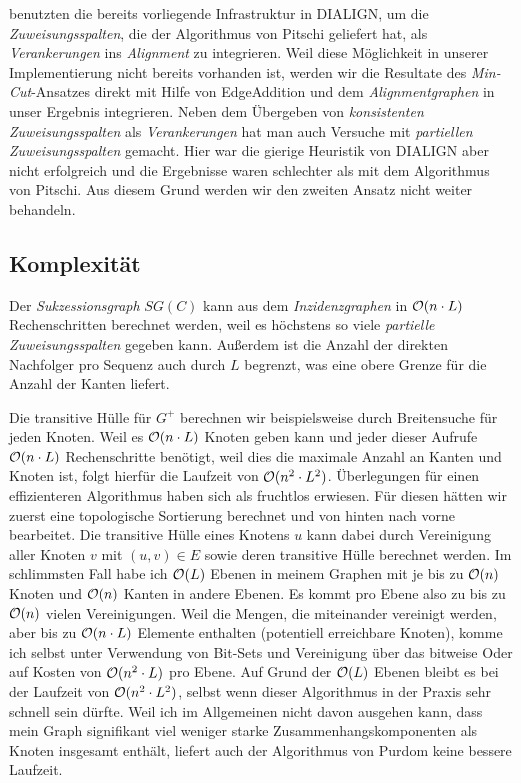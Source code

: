\cite{cpm10} benutzten die bereits vorliegende Infrastruktur in DIALIGN, um die \emph{Zuweisungsspalten}, die der Algorithmus von Pitschi geliefert hat, als \emph{Verankerungen} ins \emph{Alignment} zu integrieren. Weil diese Möglichkeit in unserer Implementierung nicht bereits vorhanden ist, werden wir die Resultate des \emph{Min-Cut}-Ansatzes direkt mit Hilfe von \textrm{EdgeAddition} und dem \emph{Alignmentgraphen} in unser Ergebnis integrieren. Neben dem Übergeben von \emph{konsistenten Zuweisungsspalten} als \emph{Verankerungen} hat man auch Versuche mit \emph{partiellen Zuweisungsspalten} gemacht. Hier war die gierige Heuristik von DIALIGN aber nicht erfolgreich und die Ergebnisse waren schlechter als mit dem Algorithmus von Pitschi. Aus diesem Grund werden wir den zweiten Ansatz nicht weiter behandeln.

\subsection{Komplexität}

Der \emph{Sukzessionsgraph} $SG(C)$ kann aus dem \emph{Inzidenzgraphen} in $\mathcal{O}(n\cdot L)$ Rechenschritten berechnet werden, weil es höchstens so viele \emph{partielle Zuweisungsspalten} gegeben kann. Außerdem ist die Anzahl der direkten Nachfolger pro Sequenz auch durch $L$ begrenzt, was eine obere Grenze für die Anzahl der Kanten liefert.

Die transitive Hülle für $G^{+}$ berechnen wir beispielsweise durch Breitensuche für jeden Knoten. Weil es $\mathcal{O}(n\cdot L)$ Knoten geben kann und jeder dieser Aufrufe $\mathcal{O}(n\cdot L)$ Rechenschritte benötigt, weil dies die maximale Anzahl an Kanten und Knoten ist, folgt hierfür die Laufzeit von $\mathcal{O}(n^2\cdot L^2)$. Überlegungen für einen effizienteren Algorithmus haben sich als fruchtlos erwiesen. Für diesen hätten wir zuerst eine topologische Sortierung berechnet und von hinten nach vorne bearbeitet. Die transitive Hülle eines Knotens $u$ kann dabei durch Vereinigung aller Knoten $v$ mit $(u,v) \in E$ sowie deren transitive Hülle berechnet werden. Im schlimmsten Fall habe ich $\mathcal{O}(L)$ Ebenen in meinem Graphen mit je bis zu $\mathcal{O}(n)$ Knoten und $\mathcal{O}(n)$ Kanten in andere Ebenen. Es kommt pro Ebene also zu bis zu $\mathcal{O}(n)$ vielen Vereinigungen. Weil die Mengen, die miteinander vereinigt werden, aber bis zu $\mathcal{O}(n\cdot L)$ Elemente enthalten (potentiell erreichbare Knoten), komme ich selbst unter Verwendung von Bit-Sets und Vereinigung über das bitweise Oder auf Kosten von $\mathcal{O}(n^2\cdot L)$ pro Ebene. Auf Grund der $\mathcal{O}(L)$ Ebenen bleibt es bei der Laufzeit von $\mathcal{O}(n^2\cdot L^2)$, selbst wenn dieser Algorithmus in der Praxis sehr schnell sein dürfte. Weil ich im Allgemeinen nicht davon ausgehen kann, dass mein Graph signifikant viel weniger starke Zusammenhangskomponenten als Knoten insgesamt enthält, liefert auch der Algorithmus von Purdom keine bessere Laufzeit.

